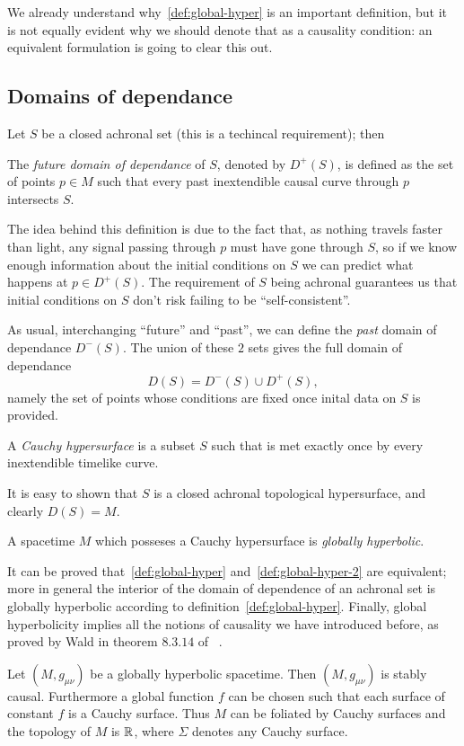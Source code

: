 We already understand why~\ref{def:global-hyper} is an important definition, but it is not equally evident why we should denote that as a causality condition: an equivalent formulation is going to clear this out.

\subsection{Domains of dependance}
Let \(S\) be a closed achronal set (this is a techincal requirement); then
\begin{definition}
	The \emph{future domain of dependance} of \(S\), denoted by \(D^+(S)\), is defined as
	the set of points \(p\in M\) such that every past inextendible causal curve through \(p\) intersects \(S\).
\end{definition}

The idea behind this definition is due to the fact that, as nothing travels faster than light, any signal passing through \(p\) must have gone through \(S\), so if we know enough information about the initial conditions on \(S\) we can predict what happens at \(p\in D^+(S)\). The requirement of \(S\) being achronal guarantees us that initial conditions on \(S\) don't risk failing to be ``self-consistent''.

As usual, interchanging ``future'' and ``past'', we can define the \emph{past} domain of dependance \(D^-(S)\). The union of these \(2\) sets gives the full domain of dependance 
\[
	D(S) = D^-(S) \cup D^+(S),
\]
namely the set of points whose conditions are fixed once inital data on \(S\) is provided.
\begin{definition}
	A \emph{Cauchy hypersurface} is a subset \(S\) such that is met exactly once by every inextendible timelike curve.
\end{definition}
It is easy to shown that \(S\) is a closed achronal topological hypersurface, and clearly \(D(S) = M\).
\begin{definition}
	\label{def:global-hyper-2}
	A spacetime \(M\) which posseses a Cauchy hypersurface is \emph{globally hyperbolic}.
\end{definition}
It can be proved that~\ref{def:global-hyper} and~\ref{def:global-hyper-2} are equivalent; more in general the interior of the domain of dependence of an achronal set is globally hyperbolic according to definition~\ref{def:global-hyper}. Finally, global hyperbolicity implies all the notions of causality we have introduced before, as proved by Wald in theorem \(8.3.14\) of~\cite{wald2010general} .
\begin{theorem}
	Let \((M,g_{\mu\nu})\) be a globally hyperbolic spacetime. Then \((M,g_{\mu\nu})\) is stably causal. Furthermore a global function \(f\) can be chosen such that each surface of constant \(f\) is a Cauchy surface. Thus \(M\) can be foliated by Cauchy surfaces and the topology of \(M\) is \(\R \time\Sigma\), where \(\Sigma\) denotes any Cauchy surface.
\end{theorem}

